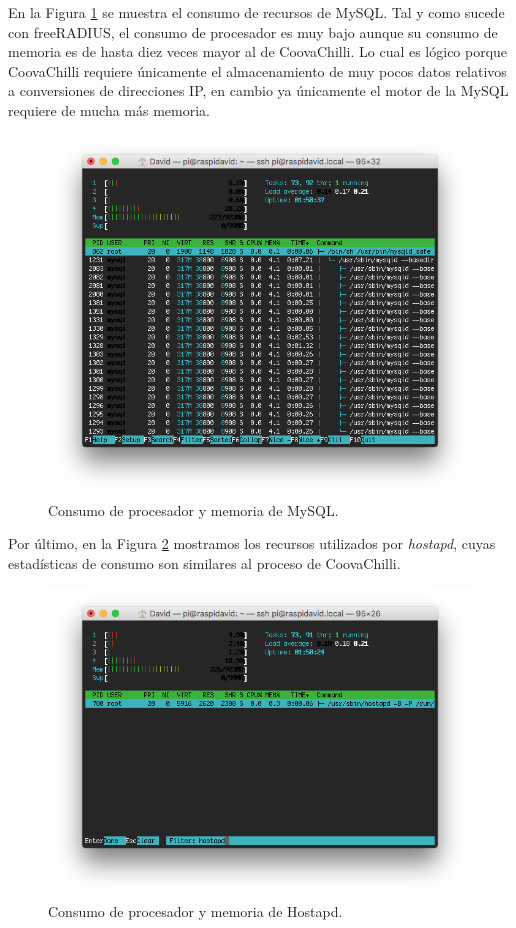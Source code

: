 En la Figura \ref{htopMySQL} se muestra el consumo de recursos de MySQL. Tal y como sucede con freeRADIUS, el consumo de procesador es muy bajo aunque su consumo de memoria es de hasta diez veces mayor al de CoovaChilli. Lo cual es lógico porque CoovaChilli requiere únicamente el almacenamiento de muy pocos datos relativos a conversiones de direcciones IP, en cambio ya únicamente el motor de la MySQL requiere de mucha más memoria.

\begin{figure}[!t]
\begin{center}
\includegraphics[width=0.75\linewidth]{./6_EvalEmpirica/Img/htopMySQL.png}
\end{center}
\caption{Consumo de procesador y memoria de MySQL.}
\label{htopMySQL}
\end{figure}

Por último, en la Figura \ref{htopHostapd} mostramos los recursos utilizados por \emph{hostapd}, cuyas estadísticas de consumo son similares al proceso de CoovaChilli.

\begin{figure}[!t]
\begin{center}
\includegraphics[width=0.75\linewidth]{./6_EvalEmpirica/Img/htopHostapd.png}
\end{center}
\caption{Consumo de procesador y memoria de Hostapd.}
\label{htopHostapd}
\end{figure}

